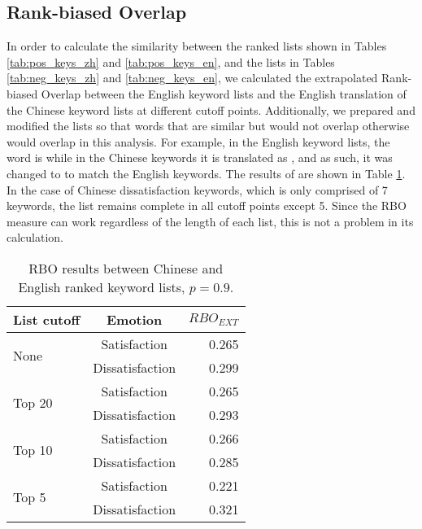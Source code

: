 \subsection{Rank-biased Overlap}\label{rboresults}

In order to calculate the similarity between the ranked lists shown in Tables \ref{tab:pos_keys_zh} and \ref{tab:pos_keys_en}, and the lists in Tables \ref{tab:neg_keys_zh} and \ref{tab:neg_keys_en}, we calculated the extrapolated Rank-biased Overlap between the English keyword lists and the English translation of the Chinese keyword lists at different cutoff points. Additionally, we prepared and modified the lists so that words that are similar but would not overlap otherwise would overlap in this analysis. For example, in the English keyword lists, the word is \DIFdelbegin {}\DIFdelend \DIFaddbegin {}\DIFaddend while in the Chinese keywords it is translated as \DIFdelbegin {}\DIFdelend \DIFaddbegin {}\DIFaddend , and as such, it was changed to \DIFdelbegin {}\DIFdelend \DIFaddbegin {}\DIFaddend to match the English keywords. \DIFaddbegin {}\DIFaddend The results of \DIFdelbegin {}\DIFdelend \DIFaddbegin {}\DIFaddend are shown in Table \ref{tab:rbo}. In the case of Chinese dissatisfaction keywords, which is only comprised of 7 keywords, the list remains complete in all cutoff points except 5. Since the RBO measure can work regardless of the length of each list, this is not a problem in its calculation.

\begin{table}[hbp]
\centering
\caption{RBO results between Chinese and English ranked keyword lists, \(p=0.9\).}
\label{tab:rbo}
\begin{tabular}{|l|c|r|}
\hline
\multicolumn{1}{|c|}{\textbf{List cutoff}} & \textbf{Emotion} & \(RBO_{EXT}\) \\ \hline
\multirow{2}{*}{None}   & Satisfaction      & 0.265 \\ \cline{2-3} 
                        & Dissatisfaction   & 0.299 \\ \hline
\multirow{2}{*}{Top 20} & Satisfaction      & 0.265 \\ \cline{2-3} 
                        & Dissatisfaction   & 0.293 \\ \hline
\multirow{2}{*}{Top 10} & Satisfaction      & 0.266 \\ \cline{2-3} 
                        & Dissatisfaction   & 0.285 \\ \hline
\multirow{2}{*}{Top 5}  & Satisfaction      & 0.221 \\ \cline{2-3} 
                        & Dissatisfaction   & 0.321 \\ \hline
\end{tabular}
\end{table}

